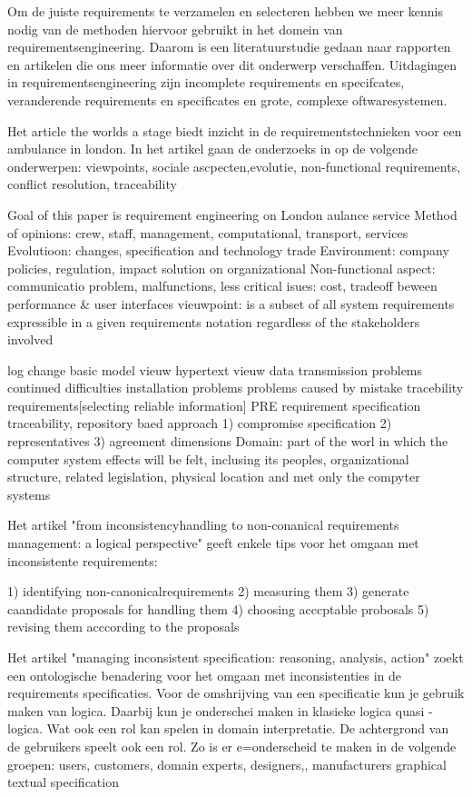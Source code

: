 Om de juiste requirements te verzamelen en selecteren hebben we meer kennis nodig van de methoden hiervoor gebruikt in het domein van requirementsengineering. Daarom is een literatuurstudie gedaan naar rapporten en artikelen die ons meer informatie over dit onderwerp verschaffen.
 Uitdagingen in requirementsengineering zijn incomplete requirements en specifcates, veranderende requirements en specificates en grote, complexe oftwaresystemen.
 
 Het article the worlds a stage \cite{breitmanLeiteCesar2002reallifeReqs}biedt inzicht in de requirementstechnieken voor een ambulance in london. In het artikel gaan de onderzoeks in op de volgende onderwerpen: 
 viewpoints, sociale ascpecten,evolutie, non-functional requirements, conflict resolution, traceability
 
 Goal of this paper is requirement  engineering on London aulance service
 Method of opinions: crew, staff, management, computational, transport, services
 Evolutioon: changes, specification and technology trade
 Environment: company policies, regulation, impact solution on organizational
 Non-functional aspect: communicatio problem, malfunctions, less critical isues: cost, tradeoff beween performance \& user interfaces
 vieuwpoint: is a subset of all system requirements expressible in a given requirements notation regardless of the stakeholders involved
 
 log change
 basic model vieuw
 hypertext vieuw
 data transmission problems
 continued difficulties
 installation problems
 problems caused by mistake
 tracebility requirements[selecting reliable information]
 PRE requirement specification traceability, repository baed approach
 1) compromise specification
 2) representatives
 3) agreement dimensions
 Domain: part of the worl in which the computer system effects will be felt, inclusing its peoples, organizational structure, related legislation, physical location and met only the compyter systems
 
 
 
 Het artikel "from inconsistencyhandling to non-conanical requirements management: a logical perspective" \cite{muHungJinLiu2013inconsistencyReqs}geeft enkele tips voor het omgaan met inconsistente requirements:
 
 1) identifying non-canonicalrequirements
 2) measuring them
 3) generate caandidate proposals for handling them
 4) choosing acccptable probosals
 5) revising them acccording to the proposals

Het artikel "managing inconsistent specification: reasoning, analysis, action" \cite{hunterNuseibeh1996manageSpecs} zoekt een ontologische benadering voor het omgaan met inconsistenties in de requirements specificaties.
Voor de omshrijving van een specificatie kun je gebruik maken van logica. Daarbij kun je onderschei maken in klasieke logica quasi -logica.
Wat ook een rol kan spelen in domain interpretatie. De achtergrond van de gebruikers speelt ook een rol.
Zo is er e=onderscheid te maken in de volgende groepen: users, customers, domain experts, designers,, manufacturers
graphical  textual specification

